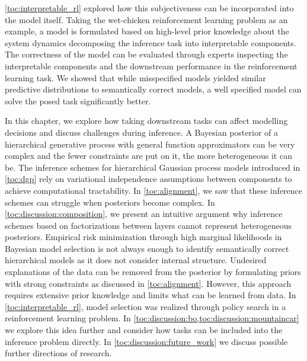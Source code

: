 \cref{toc:interpretable_rl} explored how this subjectiveness can be incorporated into the model itself.
Taking the wet-chicken reinforcement learning problem as an example, a model is formulated based on high-level prior knowledge about the system dynamics decomposing the inference task into interpretable components.
The correctness of the model can be evaluated through experts inspecting the interpretable components and the downstream performance in the reinforcement learning task.
We showed that while misspecified models yielded similar predictive distributions to semantically correct models, a well specified model can solve the posed task significantly better.

In this chapter, we explore how taking downstream tasks can affect modelling decisions and discuss challenges during inference.
A Bayesian posterior of a hierarchical generative process with general function approximators can be very complex and the fewer constraints are put on it, the more heterogeneous it can be.
The inference schemes for hierarchical Gaussian process models introduced in \cref{toc:dgp} rely on variational independence assumptions between components to achieve computational tractability.
In \cref{toc:alignment}, we saw that these inference schemes can struggle when posteriors become complex.
In \cref{toc:discussion:composition}, we present an intuitive argument why inference schemes based on factorizations between layers cannot represent heterogeneous posteriors.
Empirical risk minimization through high marginal likelihoods in Bayesian model selection is not always enough to identify semantically correct hierarchical models as it does not consider internal structure.
Undesired explanations of the data can be removed from the posterior by formulating priors with strong constraints as discussed in \cref{toc:alignment}.
However, this approach requires extensive prior knowledge and limits what can be learned from data.
In \cref{toc:interpretable_rl}, model selection was realized through policy search in a reinforcement learning problem.
In \cref{toc:discussion:bo,toc:discussion:mountaincar} we explore this idea further and consider how tasks can be included into the inference problem directly.
In \cref{toc:discussion:future_work} we discuss possible further directions of research.


